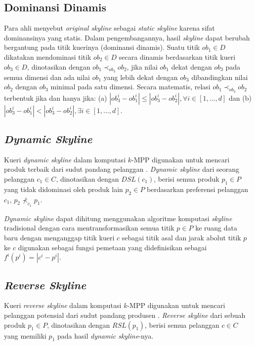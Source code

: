 \documentclass[conference]{IEEEtran}
\begin{document}
\subsection{Dominansi Dinamis}
Para ahli menyebut \textit{original skyline} sebagai \textit{static skyline} \cite{dynamic-skyline-2} karena sifat dominansinya yang statis. Dalam pengembangannya, hasil \textit{skyline} dapat berubah bergantung pada titik kuerinya (dominansi dinamis). Suatu titik $ob_1 \in D$ dikatakan mendominasi titik $ob_2 \in D$ secara dinamis berdasarkan titik kueri $ob_3 \in D$, dinotasikan dengan $ob_1 \prec_{ob_3} ob_2$, jika nilai $ob_1$ dekat dengan $ob_3$ pada semua dimensi dan ada nilai $ob_1$ yang lebih dekat dengan $ob_3$ dibandingkan nilai $ob_2$ dengan $ob_3$ minimal pada satu dimensi. Secara matematis, relasi $ob_1 \prec_{ob_3} ob_2$ terbentuk jika dan hanya jika: (a) $|ob_3^i - ob_1^i| \leq |ob_3^i - ob_2^i|, \forall i \in [1, ..., d]$ dan (b) $|ob_3^i - ob_1^i| < |ob_3^i - ob_2^i|, \exists i \in [1, ..., d]$.

\subsection{\textit{Dynamic Skyline}}
Kueri \textit{dynamic skyline} dalam komputasi $k$-MPP digunakan untuk mencari produk terbaik dari sudut pandang pelanggan \cite{kmpp}. \textit{Dynamic skyline} \cite{dynamic-skyline} dari seorang pelanggan $c_1 \in C$, dinotasikan dengan $DSL(c_1)$, berisi semua produk $p_1 \in P$ yang tidak didominasi oleh produk lain $p_2 \in P$ berdasarkan preferensi pelanggan $c_1$, $p_2 \nprec_{c_1} p_1$.

\textit{Dynamic skyline} dapat dihitung menggunakan algoritme komputasi \textit{skyline} tradisional \cite{skyline} dengan cara mentransformasikan semua titik $p \in P$ ke ruang data baru dengan menganggap titik kueri $c$ sebagai titik asal dan jarak abolut titik $p$ ke $c$ digunakan sebagai fungsi pemetaan yang didefinisikan sebagai $f^i (p^i) = |c^i-p^i|$.

\subsection{\textit{Reverse Skyline}} \label{rsl}
Kueri \textit{reverse skyline} dalam komputasi $k$-MPP digunakan untuk mencari pelanggan potensial dari sudut pandang produsen \cite{kmpp}. \textit{Reverse skyline} \cite{reverse-skyline} dari sebuah produk $p_1 \in
P$, dinotasikan dengan $RSL(p_1)$, berisi semua pelanggan $c \in C$ yang memiliki $p_1$ pada hasil \textit{dynamic skyline}-nya.
\end{document}
